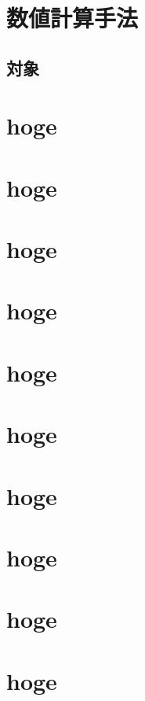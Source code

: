 \documentclass[openany,oneside,paper=a4paper,book,fontsize=12pt,jafontsize=12pt]{jlreq}
\begin{document}
\lipsum[1-4]

\chapter{数値計算手法}
\label{ch:method}

\lipsum[1]

\section{対象}
\label{sec:target}

\lipsum[1-8]


\chapter{hoge}

\chapter{hoge}

\chapter{hoge}

\chapter{hoge}

\chapter{hoge}

\chapter{hoge}

\chapter{hoge}

\chapter{hoge}

\chapter{hoge}

\chapter{hoge}
\end{document}
